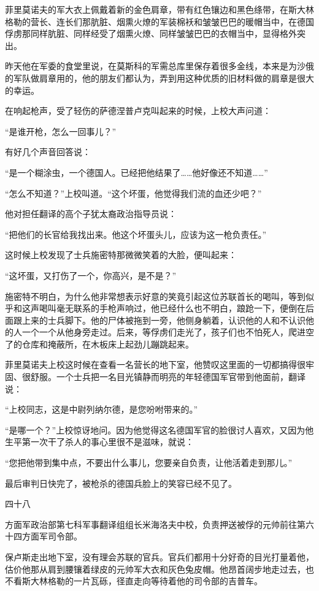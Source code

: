 菲里莫诺夫的军大衣上佩戴着新的金色肩章，带有红色镶边和黑色绦带，在斯大林格勒的营长、连长们那肮脏、烟熏火燎的军装棉袄和皱皱巴巴的暖帽当中，在德国俘虏那同样肮脏、同样经受了烟熏火燎、同样皱皱巴巴的衣帽当中，显得格外突出。

昨天他在军委的食堂里说，在莫斯科的军需总库里保存着很多金线，本来是为沙俄的军队做肩章用的，他的朋友们都认为，弄到用这种优质的旧材料做的肩章是很大的幸运。

在响起枪声，受了轻伤的萨德涅普卢克叫起来的时候，上校大声问道：

“是谁开枪，怎么一回事儿？”

有好几个声音回答说：

“是一个糊涂虫，一个德国人。已经把他结果了……他好像还不知道……”

“怎么不知道？”上校叫道。“这个坏蛋，他觉得我们流的血还少吧？”

他对担任翻译的高个子犹太裔政治指导员说：

“把他们的长官给我找出来。他这个坏蛋头儿，应该为这一枪负责任。”

这时候上校发现了士兵施密特那微微笑着的大脸，便叫起来：

“这坏蛋，又打伤了一个，你高兴，是不是？”

施密特不明白，为什么他非常想表示好意的笑竟引起这位苏联首长的喝叫，等到似乎和这声喝叫毫无联系的手枪声响过，他已经什么也不明白，踉跄一下，便倒在后面跟上来的士兵脚下。他的尸体被拖到一旁，他侧身躺着，认识他的人和不认识他的人一个一个从他身旁走过。后来，等俘虏们走光了，孩子们也不怕死人，爬进空了的仓库和掩蔽所，在木板床上起劲儿蹦跳起来。

菲里莫诺夫上校这时候在查看一名营长的地下室，他赞叹这里面的一切都搞得很牢固、很舒服。一个士兵把一名目光镇静而明亮的年轻德国军官带到他面前，翻译说：

“上校同志，这是中尉列纳尔德，是您吩咐带来的。”

“是哪一个？”上校惊讶地问。因为他觉得这名德国军官的脸很讨人喜欢，又因为他生平第一次干了杀人的事心里很不是滋味，就说：

“您把他带到集中点，不要出什么事儿，您要亲自负责，让他活着走到那儿。”

最后审判日快完了，被枪杀的德国兵脸上的笑容已经不见了。

四十八

方面军政治部第七科军事翻译组组长米海洛夫中校，负责押送被俘的元帅前往第六十四方面军司令部。

保卢斯走出地下室，没有理会苏联的官兵。官兵们都用十分好奇的目光打量着他，估价他那从肩到腰镶着绿皮的元帅军大衣和灰色兔皮帽。他昂首阔步地走过去，也不看斯大林格勒的一片瓦砾，径直走向等待着他的司令部的吉普车。

